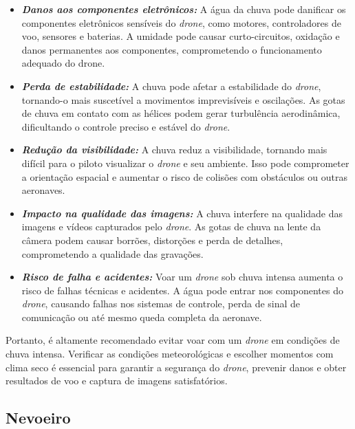 \documentclass[a4paper, 12pt, onecolumn,singlespacing]{article}
\begin{document}
	\begin{itemize}
		\item \textbf{\textit{Danos aos componentes eletrônicos:}} A água da chuva pode danificar os componentes eletrônicos sensíveis do \textit{drone}, como motores, controladores de voo, sensores e baterias. A umidade pode causar curto-circuitos, oxidação e danos permanentes aos componentes, comprometendo o funcionamento adequado do drone.
		
		\item \textbf{\textit{Perda de estabilidade:}} A chuva pode afetar a estabilidade do \textit{drone}, tornando-o mais suscetível a movimentos imprevisíveis e oscilações. As gotas de chuva em contato com as hélices podem gerar turbulência aerodinâmica, dificultando o controle preciso e estável do \textit{drone}.
		
		\item \textbf{\textit{Redução da visibilidade:}} A chuva reduz a visibilidade, tornando mais difícil para o piloto visualizar o \textit{drone} e seu ambiente. Isso pode comprometer a orientação espacial e aumentar o risco de colisões com obstáculos ou outras aeronaves.
		
		\item \textbf{\textit{Impacto na qualidade das imagens:}} A chuva interfere na qualidade das imagens e vídeos capturados pelo \textit{drone}. As gotas de chuva na lente da câmera podem causar borrões, distorções e perda de detalhes, comprometendo a qualidade das gravações.
		
		\item \textbf{\textit{Risco de falha e acidentes:}} Voar um \textit{drone} sob chuva intensa aumenta o risco de falhas técnicas e acidentes. A água pode entrar nos componentes do \textit{drone}, causando falhas nos sistemas de controle, perda de sinal de comunicação ou até mesmo queda completa da aeronave.
	\end{itemize}

	
	Portanto, é altamente recomendado evitar voar com um \textit{drone} em condições de chuva intensa. Verificar as condições meteorológicas e escolher momentos com clima seco é essencial para garantir a segurança do \textit{drone}, prevenir danos e obter resultados de voo e captura de imagens satisfatórios.

	\subsection{Nevoeiro}
	
\end{document}
